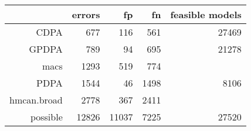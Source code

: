 \begin{tabular}{rrrrr}
  \hline
 & errors & fp & fn & feasible models \\ 
  \hline
CDPA & 677 & 116 & 561 & 27469 \\ 
  GPDPA & 789 & 94 & 695 & 21278 \\ 
  macs & 1293 & 519 & 774 &  \\ 
  PDPA & 1544 & 46 & 1498 & 8106 \\ 
  hmcan.broad & 2778 & 367 & 2411 &  \\ 
  \hline possible & 12826 & 11037 & 7225 & 27520 \\ 
   \hline
\end{tabular}
